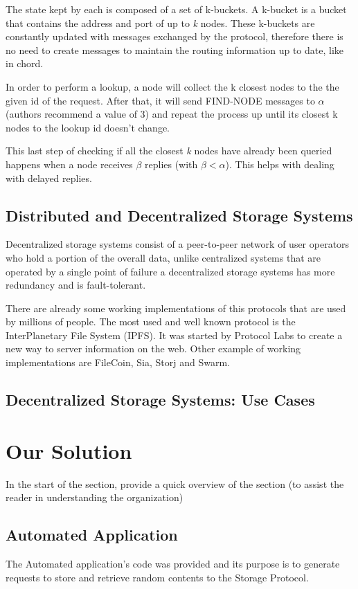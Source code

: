 \documentclass[sigconf]{acmart}
\begin{document}
The state kept by each is composed of a set of k-buckets. A k-bucket is a bucket that contains the address and port of up to \emph{k} nodes. These k-buckets are constantly updated with messages exchanged by the protocol, therefore there is no need to create messages to maintain the routing information up to date, like in chord.

In order to perform a lookup, a node will collect the k closest nodes  to the the given id of the request. After that, it will send FIND-NODE messages to $\alpha$ (authors recommend a value of 3) and repeat the process up until its closest k nodes to the lookup id doesn't change.

This last step of checking if all the closest \emph{k} nodes have already been queried happens when a node receives $\beta$ replies (with $\beta < \alpha$). This helps with dealing with delayed replies.


\subsection{Distributed and Decentralized Storage Systems}
Decentralized storage systems consist of a peer-to-peer network of user operators who hold a portion of the overall data, unlike centralized systems that are operated by a single point of failure a decentralized storage systems has more redundancy and is fault-tolerant. 

There are already some working implementations of this protocols that are used by millions of people. The most used and well known protocol is the InterPlanetary File System (IPFS). It was started by Protocol Labs to create a new way to server information on the web. Other example of working implementations are FileCoin, Sia, Storj and Swarm.

\subsection{Decentralized Storage Systems: Use Cases}



\section{Our Solution}\label{implementation}
In the start of the section, provide a quick overview of the section (to assist the reader in understanding the organization)

\subsection{Automated Application}
The Automated application's code was provided and its purpose is to generate requests to store and retrieve random contents to the Storage Protocol.
\end{document}
